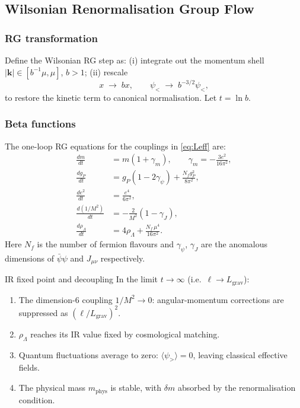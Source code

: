 \documentclass[11pt,a4paper]{article}
\theoremstyle{definition}
\theoremstyle{remark}
\begin{document}
	\subsection{Wilsonian Renormalisation Group Flow}
	\label{sec:RG}
	
	\subsubsection{RG transformation}
	
	Define the Wilsonian RG step as: (i) integrate out the momentum shell
	$|\mathbf{k}| \in [b^{-1}\mu, \mu]$, $b > 1$; (ii) rescale
	\begin{equation}
		x \;\to\; bx, \qquad
		\psi_{<} \;\to\; b^{-3/2}\psi_{<},
		\label{eq:rescaling}
	\end{equation}
	to restore the kinetic term to canonical normalisation.  Let $t = \ln b$.
	
	\subsubsection{Beta functions}
	
	The one-loop RG equations for the couplings in \eqref{eq:Leff} are:
	\begin{align}
		\frac{dm}{dt}
		&= m\left(1 + \gamma_m\right),
		\qquad \gamma_m = -\frac{3e^2}{16\pi^2}, \label{eq:beta_m}\\
		\frac{d g_P}{dt}
		&= g_P\!\left(1 - 2\gamma_\psi\right) + \frac{N_f g_P^2}{8\pi^2},
		\label{eq:beta_gP}\\
		\frac{d e^2}{dt}
		&= \frac{e^4}{6\pi^2}, \label{eq:beta_e}\\
		\frac{d(1/M^2)}{dt}
		&= -\frac{2}{M^2}\left(1 - \gamma_J\right),
		\label{eq:beta_M}\\
		\frac{d\rho_\Lambda}{dt}
		&= 4\rho_\Lambda + \frac{N_f\,\mu^4}{16\pi^2}.
		\label{eq:beta_Lambda}
	\end{align}
	Here $N_f$ is the number of fermion flavours and $\gamma_\psi$, $\gamma_J$
	are the anomalous dimensions of $\bar{\psi}\psi$ and $J_{\mu\nu}$
	respectively.
	
	IR fixed point and decoupling
		\label{prop:IR}
		In the limit $t \to \infty$ (i.e.\ $\ell \to L_{\mathrm{grav}}$):
		\begin{enumerate}
			\item The dimension-6 coupling $1/M^2 \to 0$: angular-momentum corrections
			are suppressed as $(\ell/L_{\mathrm{grav}})^2$.
			\item $\rho_\Lambda$ reaches its IR value fixed by cosmological matching.
			\item Quantum fluctuations average to zero:
			$\langle\psi_{>}\rangle = 0$, leaving classical effective fields.
			\item The physical mass $m_{\mathrm{phys}}$ is stable, with
			$\delta m$ absorbed by the renormalisation condition.
		\end{enumerate}
	
\end{document}
